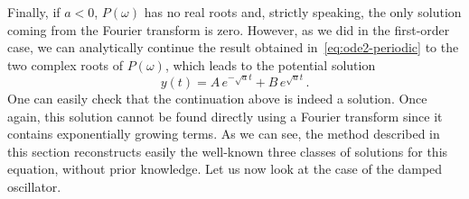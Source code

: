 Finally, if $a<0$, $P(\omega)$ has no real roots and, strictly speaking, the only solution
coming from the Fourier transform is zero. However, as we did in the first-order case, we
can analytically continue the result obtained in~\cref{eq:ode2-periodic} to the two
complex roots of $P(\omega)$, which leads to the potential solution
\begin{equation}
  y(t)=A\,e^{-\sqrt{a}t}+B\,e^{\sqrt{a}t}\,.
  \label{eq:ode2-exp}
\end{equation}
One can easily check that the continuation above is indeed a solution. Once again, this
solution cannot be found directly using a Fourier transform since it contains
exponentially growing terms. As we can see, the method described in this section
reconstructs easily the well-known three classes of solutions for this equation, without
prior knowledge. Let us now look at the case of the damped oscillator.
